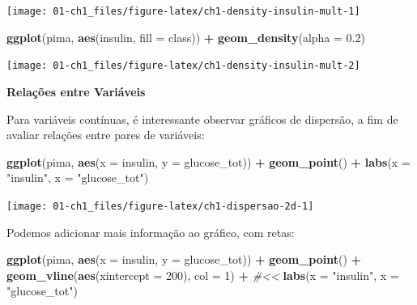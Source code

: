 \documentclass[
]{book}
\newenvironment{Shaded}{\begin{snugshade}}{\end{snugshade}}
\newcommand{\CommentTok}[1]{\textcolor[rgb]{0.56,0.35,0.01}{\textit{#1}}}
\newcommand{\DataTypeTok}[1]{\textcolor[rgb]{0.13,0.29,0.53}{#1}}
\newcommand{\DecValTok}[1]{\textcolor[rgb]{0.00,0.00,0.81}{#1}}
\newcommand{\FloatTok}[1]{\textcolor[rgb]{0.00,0.00,0.81}{#1}}
\newcommand{\KeywordTok}[1]{\textcolor[rgb]{0.13,0.29,0.53}{\textbf{#1}}}
\newcommand{\NormalTok}[1]{#1}
\newcommand{\OperatorTok}[1]{\textcolor[rgb]{0.81,0.36,0.00}{\textbf{#1}}}
\newcommand{\StringTok}[1]{\textcolor[rgb]{0.31,0.60,0.02}{#1}}
\theoremstyle{definition}
\theoremstyle{definition}
\theoremstyle{definition}
\theoremstyle{remark}
\begin{document}
\texttt{[image: 01-ch1\_files/figure-latex/ch1-density-insulin-mult-1]}

\begin{Shaded}
\begin{Highlighting}[]
\KeywordTok{ggplot}\NormalTok{(pima,  }\KeywordTok{aes}\NormalTok{(insulin, }\DataTypeTok{fill =}\NormalTok{ class)) }\OperatorTok{+}\StringTok{ }
\StringTok{  }\KeywordTok{geom_density}\NormalTok{(}\DataTypeTok{alpha =} \FloatTok{0.2}\NormalTok{) }
\end{Highlighting}
\end{Shaded}

\texttt{[image: 01-ch1\_files/figure-latex/ch1-density-insulin-mult-2]}

\textbf{Relações entre Variáveis}

Para variáveis contínuas, é interessante observar gráficos de dispersão, a fim de avaliar relações entre pares de variáveis:

\begin{Shaded}
\begin{Highlighting}[]
\KeywordTok{ggplot}\NormalTok{(pima, }\KeywordTok{aes}\NormalTok{(}\DataTypeTok{x =}\NormalTok{ insulin, }\DataTypeTok{y =}\NormalTok{ glucose_tot)) }\OperatorTok{+}\StringTok{ }
\StringTok{  }\KeywordTok{geom_point}\NormalTok{() }\OperatorTok{+}
\StringTok{  }\KeywordTok{labs}\NormalTok{(}\DataTypeTok{x =} \StringTok{"insulin"}\NormalTok{, }\DataTypeTok{x =} \StringTok{"glucose_tot"}\NormalTok{)}
\end{Highlighting}
\end{Shaded}

\texttt{[image: 01-ch1\_files/figure-latex/ch1-dispersao-2d-1]}

Podemos adicionar mais informação ao gráfico, com retas:

\begin{Shaded}
\begin{Highlighting}[]
\KeywordTok{ggplot}\NormalTok{(pima, }\KeywordTok{aes}\NormalTok{(}\DataTypeTok{x =}\NormalTok{ insulin, }\DataTypeTok{y =}\NormalTok{ glucose_tot)) }\OperatorTok{+}\StringTok{  }
\StringTok{  }\KeywordTok{geom_point}\NormalTok{() }\OperatorTok{+}
\StringTok{  }\KeywordTok{geom_vline}\NormalTok{(}\KeywordTok{aes}\NormalTok{(}\DataTypeTok{xintercept =} \DecValTok{200}\NormalTok{), }\DataTypeTok{col =} \DecValTok{1}\NormalTok{) }\OperatorTok{+}\StringTok{                               }\CommentTok{#<<}
\StringTok{  }\KeywordTok{labs}\NormalTok{(}\DataTypeTok{x =} \StringTok{"insulin"}\NormalTok{, }\DataTypeTok{x =} \StringTok{"glucose_tot"}\NormalTok{)}
\end{Highlighting}
\end{Shaded}
\end{document}
